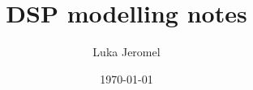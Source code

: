 \usepackage[english]{babel}
\usepackage[utf8]{inputenc}
\usepackage[T1]{fontenc}

\usepackage{lmodern}

\usepackage{gensymb}

\usepackage{textgreek}

\usepackage{amsmath}
\usepackage{amssymb}

\usepackage{IEEEtrantools}


\usepackage{float}

\usepackage[margin=2cm,bottom=3cm,foot=1.5cm]{geometry}
\frenchspacing

\usepackage{fontspec}
\setmainfont{Calibri}

\usepackage{graphicx}
\graphicspath{{figures/}} %


\usepackage{xcolor}

\usepackage{parskip}

\usepackage{hyperref}
\hypersetup{
    colorlinks=true,
    linkcolor=blue,
    filecolor=brown,
    urlcolor=darkgreen,
}

\newcommand{\ud}{\,\mathrm{d}}
\newcommand{\ve}[1]{\vec{#1}}





\title{DSP modelling notes}
\author{Luka Jeromel}
\date{\today}